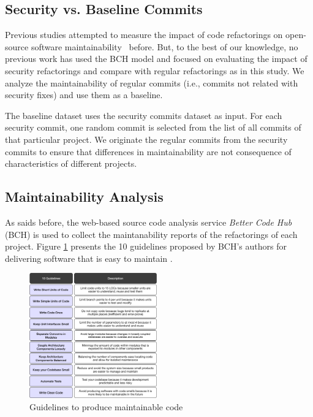 \documentclass[10pt,conference]{IEEEtran}
\begin{document}
\subsection{Security vs. Baseline Commits}
%
Previous studies attempted to measure the impact of code refactorings on
open-source software maintainability~\cite{HEGEDUS2018313} before. But, to the
best of our knowledge, no previous work has used the BCH model and focused on
evaluating the impact of security refactorings and compare with regular
refactorings as in this study. We analyze the maintainability of regular commits
(i.e., commits not related with security fixes) and use them as a baseline.

The baseline dataset uses the security commits dataset as input. For each
security commit, one random commit is selected from the list of all commits of
that particular project. We originate the regular commits from the security
commits to ensure that differences in maintainability are not consequence of
characteristics of different projects.
%
\subsection{Maintainability Analysis}

As saids before, the web-based source code analysis service \emph{Better Code
Hub} (BCH) is used to collect the maintanability reports of the refactorings of
each project. Figure \ref{fig:guidelines} presents the 10 guidelines
proposed by BCH's authors for delivering software that is easy to maintain
\cite{Visser:2016:OREILLY}.

\begin{figure}[H]
 	\centering 	\includegraphics[width=0.49\textwidth]{figures/guidelines.pdf}
 	\caption{Guidelines to produce maintainable code}
	\label{fig:guidelines}
\end{figure}
\end{document}
